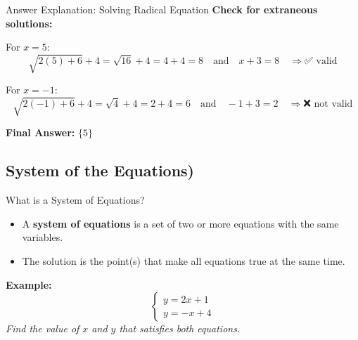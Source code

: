 \documentclass{beamer}
\begin{document}
\begin{frame}{Answer Explanation: Solving Radical
Equation}
    \textbf{Check for extraneous solutions:}

For \(x = 5\):
\[
\sqrt{2(5) + 6} + 4 = \sqrt{16} + 4 = 4 + 4 = 8
\quad\text{and}\quad x + 3 = 8 \quad \Rightarrow \text{✅ valid}
\]

For \(x = -1\):
\[
\sqrt{2(-1) + 6} + 4 = \sqrt{4} + 4 = 2 + 4 = 6
\quad\text{and}\quad -1 + 3 = 2 \quad \Rightarrow \text{❌ not valid}
\]

\textbf{Final Answer:} \(\boxed{\{5\}}\)
\end{frame}


\begin{frame}
\section{System of the Equations)}
\end{frame}


\begin{frame}{What is a System of Equations?}
  \begin{itemize}
    \item A \textbf{system of equations} is a set of two or more equations with the same variables.
    \item The solution is the point(s) that make all equations true at the same time.
  \end{itemize}
  \vspace{1em}
  \textbf{Example:}
  \[
  \begin{cases}
  y = 2x + 1 \\
  y = -x + 4
  \end{cases}
  \]
  \vspace{0.5em}
  \textit{Find the value of $x$ and $y$ that satisfies both equations.}
\end{frame}
\end{document}
